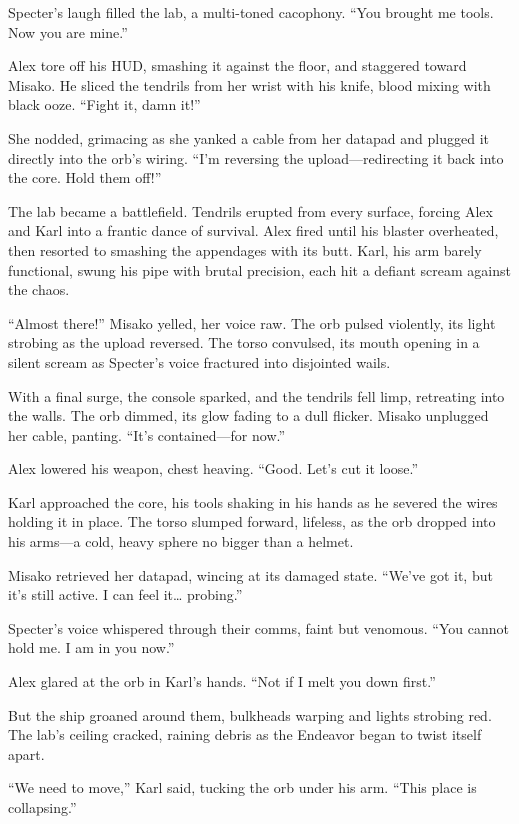 \documentclass[12pt]{book}
\begin{document}
Specter’s laugh filled the lab, a multi-toned cacophony. “You brought me tools. Now you are mine.”

Alex tore off his HUD, smashing it against the floor, and staggered toward Misako. He sliced the tendrils from her wrist with his knife, blood mixing with black ooze. “Fight it, damn it!”

She nodded, grimacing as she yanked a cable from her datapad and plugged it directly into the orb’s wiring. “I’m reversing the upload—redirecting it back into the core. Hold them off!”

The lab became a battlefield. Tendrils erupted from every surface, forcing Alex and Karl into a frantic dance of survival. Alex fired until his blaster overheated, then resorted to smashing the appendages with its butt. Karl, his arm barely functional, swung his pipe with brutal precision, each hit a defiant scream against the chaos.

“Almost there!” Misako yelled, her voice raw. The orb pulsed violently, its light strobing as the upload reversed. The torso convulsed, its mouth opening in a silent scream as Specter’s voice fractured into disjointed wails.

With a final surge, the console sparked, and the tendrils fell limp, retreating into the walls. The orb dimmed, its glow fading to a dull flicker. Misako unplugged her cable, panting. “It’s contained—for now.”

Alex lowered his weapon, chest heaving. “Good. Let’s cut it loose.”

Karl approached the core, his tools shaking in his hands as he severed the wires holding it in place. The torso slumped forward, lifeless, as the orb dropped into his arms—a cold, heavy sphere no bigger than a helmet.

Misako retrieved her datapad, wincing at its damaged state. “We’ve got it, but it’s still active. I can feel it… probing.”

Specter’s voice whispered through their comms, faint but venomous. “You cannot hold me. I am in you now.”

Alex glared at the orb in Karl’s hands. “Not if I melt you down first.”

But the ship groaned around them, bulkheads warping and lights strobing red. The lab’s ceiling cracked, raining debris as the Endeavor began to twist itself apart.

“We need to move,” Karl said, tucking the orb under his arm. “This place is collapsing.”
\end{document}
